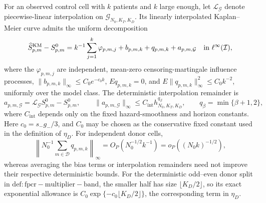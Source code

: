 For an observed control cell with \(k\) patients and \(k\) large enough, let \(\mathcal L_{\mathcal G}\) denote piecewise-linear interpolation on \(\mathcal G_{N_0,K_T,K_D}\).  Its linearly interpolated Kaplan--Meier curve admits the uniform decomposition
\[
 \widehat S^{\mathrm{KM}}_{p,m}-S^0_{p,m}
 =k^{-1}\sum_{j=1}^{k}\varphi_{p,m,j}+b_{p,m,k}+q_{p,m,k}+a_{p,m,\mathcal G}
 \quad\hbox{in }\ell^\infty(\mathcal I),
\]
where the \(\varphi_{p,m,j}\) are independent, mean-zero censoring-martingale influence processes, \(\|b_{p,m,k}\|_\infty\le C_0e^{-c_0k}\), \(E q_{p,m,k}=0\), and \(E\|q_{p,m,k}\|_\infty^2\le C_0k^{-2}\), uniformly over the model class.  The deterministic interpolation remainder is
\[
 a_{p,m,\mathcal G}=\mathcal L_{\mathcal G}S^0_{p,m}-S^0_{p,m},
 \qquad
 \|a_{p,m,\mathcal G}\|_\infty
 \le C_{\mathrm{int}}h_{N_0,K_T,K_D}^{q_\beta},
 \qquad q_\beta=\min\{\beta+1,2\},
\]
where \(C_{\mathrm{int}}\) depends only on the fixed hazard-smoothness and horizon constants.  Here \(c_0=s_-g_-/3\), and \(C_0\) may be chosen as the conservative fixed constant used in the definition of \(\eta_D\).  For independent donor cells,
\[
 \left\|N_0^{-1}\sum_{m\in\mathcal D}q_{p,m,k}\right\|_\infty
 =O_P(N_0^{-1/2}k^{-1})
 =o_P((N_0k)^{-1/2}),
\]
whereas averaging the bias terms or interpolation remainders need not improve their respective deterministic bounds.  For the deterministic odd--even donor split in \(\mathrm{def:fpcr-multiplier-band}\), the smaller half has size \(\lfloor K_D/2\rfloor\), so its exact exponential allowance is \(C_0\exp\{-c_0\lfloor K_D/2\rfloor\}\), the corresponding term in \(\eta_D\).